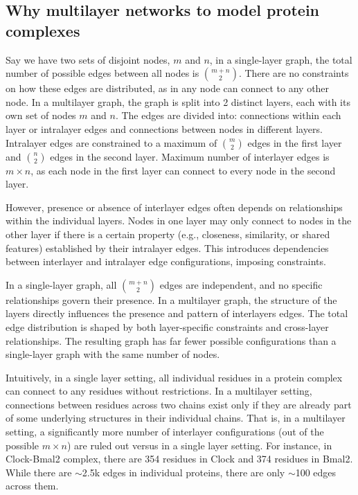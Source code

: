 \documentclass[10pt,letterpaper]{article}
\begin{document}
\subsection*{Why multilayer networks to model protein complexes}
Say we have two sets of disjoint nodes, $m$ and $n$, in a single-layer graph, the total number of possible edges between all nodes is $m+n \choose 2$. There are no constraints on how these edges are distributed, as in any node can connect to any other node. In a multilayer graph, the graph is split into 2 distinct layers, each with its own set of nodes $m$ and $n$. The edges are divided into: connections within each layer or intralayer edges and connections between nodes in different layers. Intralayer edges are constrained to a maximum of $m \choose 2$ edges in the first layer and $n \choose 2$ edges in the second layer. Maximum number of interlayer edges is $m \times n$, as each node in the first layer can connect to every node in the second layer. 

However, presence or absence of interlayer edges often depends on relationships within the individual layers. Nodes in one layer may only connect to nodes in the other layer if there is a certain property (e.g., closeness, similarity, or shared features) established by their intralayer edges. This introduces dependencies between interlayer and intralayer edge configurations, imposing constraints. 

In a single-layer graph, all $m+n \choose 2$ edges are independent, and no specific relationships govern their presence. In a multilayer graph, the structure of the layers directly influences the presence and pattern of interlayers edges. The total edge distribution is shaped by both layer-specific constraints and cross-layer relationships. The resulting graph has far fewer possible configurations than a single-layer graph with the same number of nodes. 

Intuitively, in a single layer setting, all individual residues in a protein complex can connect to any residues without restrictions. In a multilayer setting, connections between  residues across two chains exist only if they are already part of some underlying structures in their individual chains. That is, in a multilayer setting, a significantly more number of interlayer configurations (out of the possible $m \times n$) are ruled out versus in a single layer setting. For instance, in Clock-Bmal2 complex, there are 354 residues in Clock and 374 residues in Bmal2. While there are $\sim$2.5k edges in individual proteins, there are only $\sim$100 edges across them. 
\end{document}
